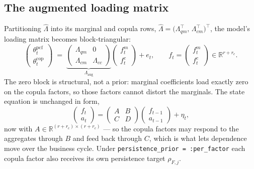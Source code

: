 \documentclass[11pt]{article}
\newcommand{\cop}{\mathrm{cop}}
\newcommand{\pcf}{\mathrm{pcf}}
\newcommand{\code}[1]{\texttt{#1}}
\begin{document}
\subsection{The augmented loading matrix}\label{sec:blocktri}

Partitioning $\hat\Lambda$ into its marginal and copula rows,
$\hat\Lambda = \bigl(\Lambda_{qm}^{\top},\, \Lambda_{cm}^{\top}\bigr)^{\top}$,
the model's loading matrix becomes block-triangular:
\begin{equation}
  \begin{pmatrix} \theta^{\pcf}_{t} \\[2pt] \theta^{\cop}_{t} \end{pmatrix}
  \;=\;
  \underbrace{\begin{pmatrix} \Lambda_{qm} & 0 \\ \Lambda_{cm} & \Lambda_{cc} \end{pmatrix}}_{\textstyle \Lambda_{\mathrm{aug}}}
  \begin{pmatrix} f^m_t \\ f^c_t \end{pmatrix} + e_t ,
  \qquad
  f_t = \begin{pmatrix} f^m_t \\ f^c_t \end{pmatrix} \in \mathbb{R}^{r + r_c}.
  \label{eq:blockload}
\end{equation}
The zero block is structural, not a prior: marginal coefficients load exactly
zero on the copula factors, so those factors cannot distort the marginals. The
state equation is unchanged in form,
\begin{equation}
  \begin{pmatrix} f_t \\ a_t \end{pmatrix} =
  \begin{pmatrix} A & B \\ C & D \end{pmatrix}
  \begin{pmatrix} f_{t-1} \\ a_{t-1} \end{pmatrix} + \eta_t ,
\end{equation}
now with $A \in \mathbb{R}^{(r+r_c)\times(r+r_c)}$ --- so the copula factors may
respond to the aggregates through $B$ and feed back through $C$, which is what
lets dependence move over the business cycle. Under
\code{persistence\_prior = :per\_factor} each copula factor also receives its
own persistence target $\rho_{F,j}$.
\end{document}
